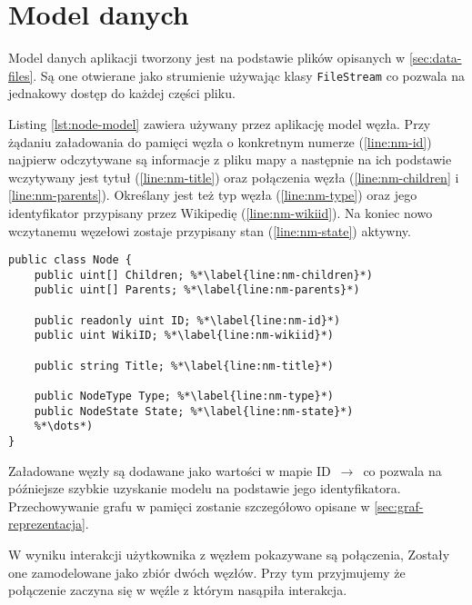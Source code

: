 \section{Model danych}
Model danych aplikacji tworzony jest na podstawie plików opisanych w \ref{sec:data-files}. Są one otwierane jako strumienie używając klasy \lstinline[basicstyle=\normalsize]{FileStream} co pozwala na jednakowy dostęp do każdej części pliku. 

Listing \ref{lst:node-model} zawiera używany przez aplikację model węzła. Przy żądaniu załadowania do pamięci węzła o konkretnym numerze (\ref{line:nm-id}) najpierw odczytywane są informacje z pliku mapy a następnie na ich podstawie wczytywany jest tytuł (\ref{line:nm-title}) oraz połączenia węzła (\ref{line:nm-children} i \ref{line:nm-parents}). Określany jest też typ węzła (\ref{line:nm-type}) oraz jego identyfikator przypisany przez Wikipedię (\ref{line:nm-wikiid}). Na koniec nowo wczytanemu węzełowi zostaje przypisany stan (\ref{line:nm-state}) aktywny.
\begin{lstlisting}[caption={Model węzła grafu}, label=lst:node-model]
public class Node {
	public uint[] Children; %*\label{line:nm-children}*)
	public uint[] Parents; %*\label{line:nm-parents}*)

	public readonly uint ID; %*\label{line:nm-id}*)
	public uint WikiID; %*\label{line:nm-wikiid}*)

	public string Title; %*\label{line:nm-title}*)

	public NodeType Type; %*\label{line:nm-type}*)
	public NodeState State; %*\label{line:nm-state}*)
	%*\dots*)
}
\end{lstlisting}

Załadowane węzły są dodawane jako wartości w mapie ID $\,\to\,$  co pozwala na późniejsze szybkie uzyskanie modelu na podstawie jego identyfikatora. Przechowywanie grafu w pamięci zostanie szczegółowo opisane w \ref{sec:graf-reprezentacja}.

W wyniku interakcji użytkownika z węzłem pokazywane są połączenia, Zostały one zamodelowane jako zbiór dwóch węzłów. Przy tym przyjmujemy że połączenie zaczyna się w węźle z którym nasąpiła interakcja.
